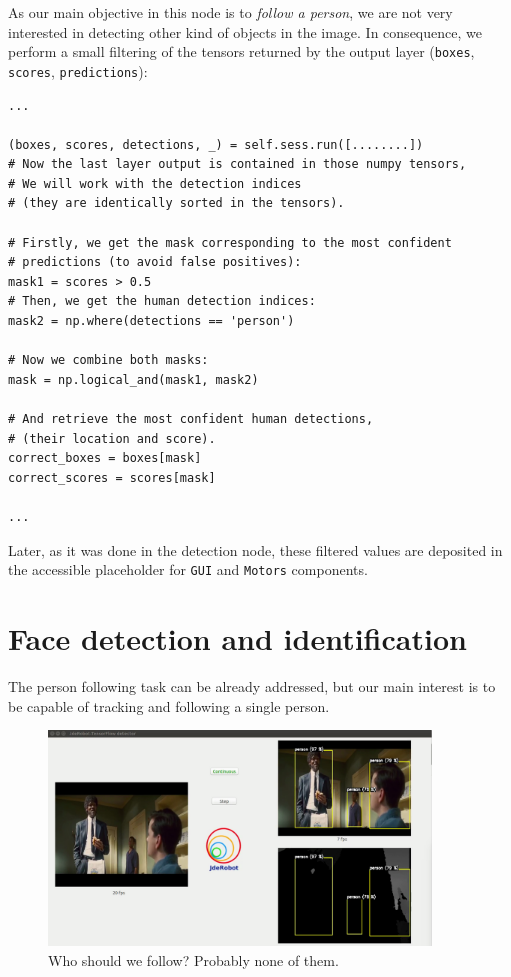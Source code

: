 	As our main objective in this node is to \emph{follow a person}, we are not very interested in detecting other kind of objects in the image. In consequence, we perform a small filtering of the tensors returned by the output layer (\texttt{boxes}, \texttt{scores}, \texttt{predictions}):
	
	\begin{lstlisting}
...

(boxes, scores, detections, _) = self.sess.run([........])
# Now the last layer output is contained in those numpy tensors,
# We will work with the detection indices
# (they are identically sorted in the tensors).

# Firstly, we get the mask corresponding to the most confident
# predictions (to avoid false positives):
mask1 = scores > 0.5
# Then, we get the human detection indices:
mask2 = np.where(detections == 'person')

# Now we combine both masks:
mask = np.logical_and(mask1, mask2)

# And retrieve the most confident human detections,
# (their location and score).
correct_boxes = boxes[mask]
correct_scores = scores[mask]

...
	\end{lstlisting}
	
	Later, as it was done in the detection node, these filtered values are deposited in the accessible placeholder for \texttt{GUI} and \texttt{Motors} components.
\section{Face detection and identification}
	The person following task can be already addressed, but our main interest is to be capable of tracking and following a single person.
	
	\begin{figure}[h]
		\centering
		\includegraphics[width=4in]{images/followperson_pulp}
		\caption{Who should we follow? Probably none of them.}
		\label{fig:6_followperson_pulp}
	\end{figure}
	
